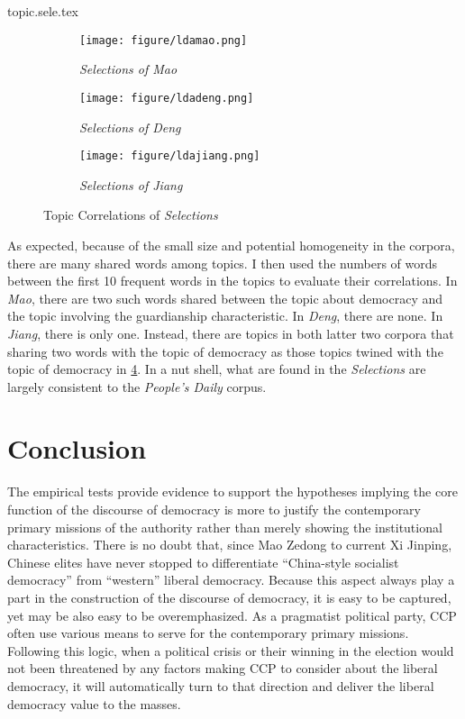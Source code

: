 \documentclass[abstracton,UTF8]{ctexart}
\begin{document}
{topic.sele.tex}

\begin{figure}[htbp]
	\begin{subfigure}{0.5\textwidth}
		\texttt{[image: figure/ldamao.png]}
		\caption{\textit{Selections of Mao}}
		\label{f:ldamao}
	\end{subfigure}
	\begin{subfigure}{0.5\textwidth}
		\texttt{[image: figure/ldadeng.png]}
		\caption{\textit{Selections of Deng}}
		\label{f:laddeng}
	\end{subfigure}
	\begin{subfigure}{0.5\textwidth}
		\texttt{[image: figure/ldajiang.png]}
		\caption{\textit{Selections of Jiang}}
		\label{f:ldajiang}
	\end{subfigure}
	\caption{Topic Correlations of \textit{Selections}}
	\label{f:lda.sele}
\end{figure}

As expected, because of the small size and potential homogeneity in the corpora, there are many shared words among topics. I then used the numbers of words between the first 10 frequent words in the topics to evaluate their correlations. In \textit{Mao}, there are two such words shared between the topic about democracy and the topic involving the guardianship characteristic. In \textit{Deng}, there are none. In \textit{Jiang}, there is only one. Instead, there are topics in both latter two corpora that sharing two words with the topic of democracy as those topics twined with the topic of democracy in \cref{f:lda.sele}. In a nut shell, what are found in the \textit{Selections} are largely consistent to the \textit{People's Daily} corpus. 


\section{Conclusion}

The empirical tests provide evidence to support the hypotheses implying the core function of the discourse of democracy is more to justify the contemporary primary missions of the authority rather than merely showing the institutional characteristics. There is no doubt that, since Mao Zedong to current Xi Jinping, Chinese elites have never stopped to differentiate ``China-style socialist democracy'' from ``western'' liberal democracy\citep{Lu2014a,Nathan1986}. Because this aspect always play a part in the construction of the discourse of democracy, it is easy to be captured, yet may be also easy to be overemphasized. As a pragmatist political party, CCP often use various means to serve for the contemporary primary missions. Following this logic, when a political crisis or their winning in the election would not been threatened by any factors making CCP to consider about the liberal democracy, it will automatically turn to that direction and deliver the liberal democracy value to the masses. 
\end{document}

